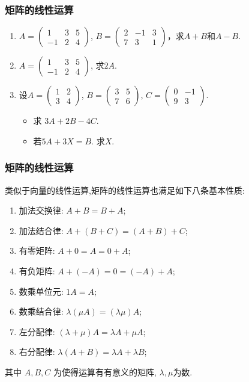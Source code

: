 \begin{frame}\frametitle{矩阵的线性运算}

\pp
\begin{example}
\begin{enumerate}
\item   $A = \left(\begin{array}{ccc}
1 & 3 & 5\\
- 1 & 2 & 4
\end{array}\right)$, $B = \left(\begin{array}{ccc}
2 & - 1 & 3\\
7 & 3 & 1
\end{array}\right)$，求$A+B$和$A-B$.
\pp
\bigskip

\item   $A = \left(\begin{array}{ccc}
1 & 3 & 5\\
- 1 & 2 & 4
\end{array}\right)$, 求$2A$.
\pp
\bigskip

\item 设$A=\begin{pmatrix}1&2\\3&4\end{pmatrix}$, $B=\begin{pmatrix}3&5\\7&6\end{pmatrix}$, $C=\begin{pmatrix}0&-1\\9&3\end{pmatrix}$.
\begin{itemize}
\item 求 $3A+2B-4C$.
\item 若$5A+3X =B$. 求$X$.
\end{itemize}
\end{enumerate}
\end{example}
\end{frame}






\begin{frame}\frametitle{矩阵的线性运算}
类似于向量的线性运算,矩阵的线性运算也满足如下八条基本性质:
\begin{theorem}
\begin{enumerate}
\item 加法交换律: $A+B=B+A$;
\item 加法结合律: $A+(B+C)=(A+B)+C$;
\item 有零矩阵: $A+0=A=0+A$;
\item 有负矩阵: $A+(-A)=0=(-A)+A$;
\item 数乘单位元: $1A = A$;
\item 数乘结合律: $\lambda(\mu A)=(\lambda \mu)A$;
\item 左分配律: $(\lambda+\mu)A=\lambda A + \mu A$;
\item 右分配律: $\lambda (A+B) =\lambda A + \lambda B$;
\end{enumerate}
其中 $A,B,C$ 为使得运算有有意义的矩阵, $\lambda,\mu$为数.
\end{theorem}
\end{frame}





